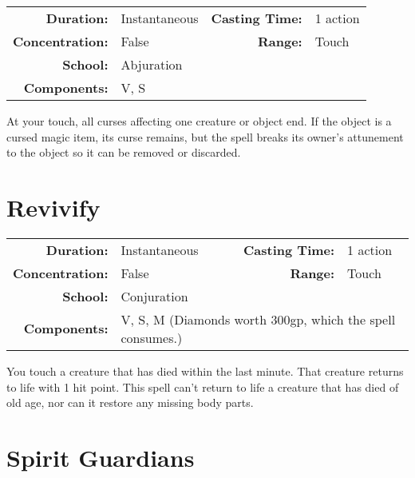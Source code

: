 \documentclass[a5paper, 12pt]{memoir}
\begin{document}
{
\small\centering\vspace{-6pt}
\begin{tabular}{rlrl}
\toprule

\textbf{Duration:} & Instantaneous &
\textbf{Casting Time:} & 1 action \\
\textbf{Concentration:} & False &
\textbf{Range:} & Touch \\
\textbf{School:} & Abjuration \\
\textbf{Components:} & \multicolumn{3}{p{0.7\textwidth}}{V, S}\\

\bottomrule
\end{tabular}
}

\vspace{1\baselineskip}\noindent At your touch, all curses affecting one creature or object end. If the object is a cursed magic item, its curse remains, but the spell breaks its owner's attunement to the object so it can be removed or discarded.

\newpage
\section*{Revivify}

{
\small\centering\vspace{-6pt}
\begin{tabular}{rlrl}
\toprule

\textbf{Duration:} & Instantaneous &
\textbf{Casting Time:} & 1 action \\
\textbf{Concentration:} & False &
\textbf{Range:} & Touch \\
\textbf{School:} & Conjuration \\
\textbf{Components:} & \multicolumn{3}{p{0.7\textwidth}}{V, S, M (Diamonds worth 300gp, which the spell consumes.)}\\

\bottomrule
\end{tabular}
}

\vspace{1\baselineskip}\noindent You touch a creature that has died within the last minute. That creature returns to life with 1 hit point. This spell can't return to life a creature that has died of old age, nor can it restore any missing body parts.

\newpage
\section*{Spirit Guardians}
\end{document}
